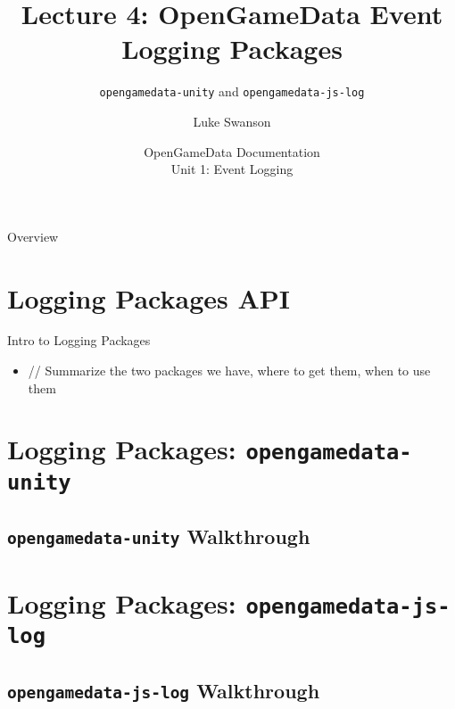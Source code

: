 \documentclass{beamer}
\title[Logging Packages] %
{Lecture 4: OpenGameData Event Logging Packages}
\subtitle
{\texttt{opengamedata-unity} and \texttt{opengamedata-js-log}} %
\author[Swanson] %
{Luke Swanson}
\institute[University of Wisconsin-Madison] %
{
  Field Day Lab\\
  University of Wisconsin-Madison
}
\date[OGD Docs] %
{OpenGameData Documentation \\ Unit 1: Event Logging}
\begin{document}
\begin{frame}
  \titlepage
\end{frame}

\begin{frame}{Overview}
  \tableofcontents
\end{frame}




\section[Logging API]{Logging Packages API}

\begin{frame}{Intro to Logging Packages}
  \begin{itemize}
  \item
    // Summarize the two packages we have, where to get them, when to use them
    \pause
  \end{itemize}
\end{frame}

\section[ogd-unity]{Logging Packages: \texttt{opengamedata-unity}}

\subsection[Walkthrough]{\texttt{opengamedata-unity} Walkthrough}

\section[ogd-js-log]{Logging Packages: \texttt{opengamedata-js-log}}

\subsection[Walkthrough]{\texttt{opengamedata-js-log} Walkthrough}
\end{document}
